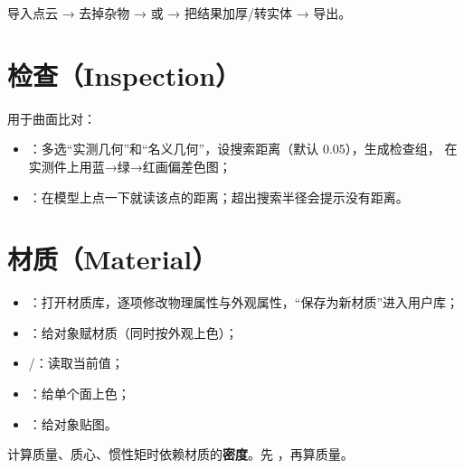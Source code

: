 \begin{practice}[练习：扫描件逆向]
导入点云 →  去掉杂物 →  或  → 把结果加厚/转实体 → 导出。
\end{practice}

\section{检查（Inspection）}

用于曲面比对：

\begin{itemize}
  \item {}：多选“实测几何”和“名义几何”，设搜索距离（默认 0.05），生成检查组，
        在实测件上用蓝→绿→红画偏差色图；
  \item {}：在模型上点一下就读该点的距离；超出搜索半径会提示没有距离。
\end{itemize}

\section{材质（Material）}

\begin{itemize}
  \item {}：打开材质库，逐项修改物理属性与外观属性，“保存为新材质”进入用户库；
  \item {}：给对象赋材质（同时按外观上色）；
  \item {}/：读取当前值；
  \item {}：给单个面上色；
  \item {}：给对象贴图。
\end{itemize}

\begin{tip}[质量属性需要密度]
 计算质量、质心、惯性矩时依赖材质的\textbf{密度}。先 ，再算质量。
\end{tip}
